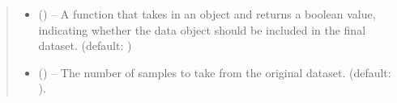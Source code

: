 \documentclass[letterpaper,10pt,english]{sphinxhowto}
\begin{document}
\begin{fulllineitems}
\begin{quote}
\begin{description}
\begin{itemize}
\item {} 
\sphinxAtStartPar
{} (\sphinxstyleliteralemphasis{\sphinxupquote{, }}) – A function that takes in an  object and returns a boolean value, indicating whether the data object should be included in the final dataset. (default: )

\item {} 
\sphinxAtStartPar
{} () – The number of samples to take from the original dataset. (default: ).

\end{itemize}

\end{description}\end{quote}

\begin{fulllineitems}
\label{\detokenize{datasets:datasets.RoadDataset.__init__}}
\pysigstartsignatures
{}
\pysigstopsignatures
\end{fulllineitems}


\begin{fulllineitems}
\label{\detokenize{datasets:datasets.RoadDataset._abc_impl}}
\pysigstartsignatures
{}
\pysigstopsignatures
\end{fulllineitems}


\end{fulllineitems}
\end{document}
